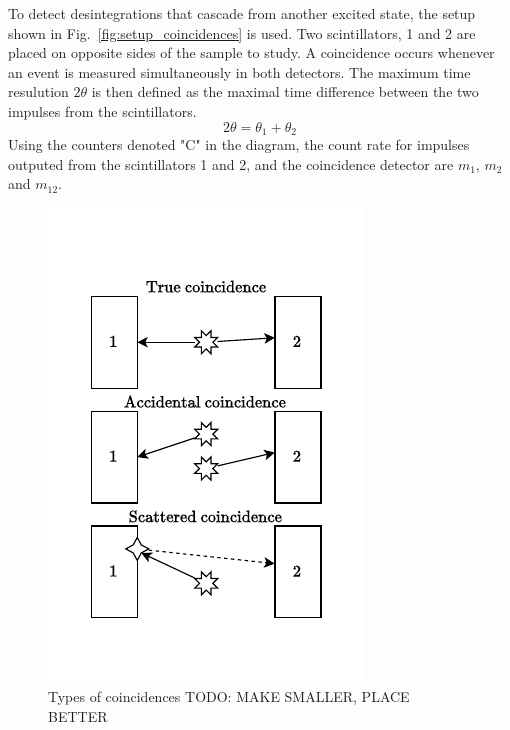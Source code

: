 To detect desintegrations that cascade from another excited state, the setup shown in \hbox{Fig. \ref{fig:setup_coincidences}} is used. Two scintillators, 1 and 2 are placed on opposite sides of the sample to study. A coincidence occurs whenever an event is measured simultaneously in both detectors. The maximum time resulution \(2 \theta\) is then defined as the maximal time difference between the two impulses from the scintillators.
\begin{equation}
    2 \theta = \theta_1 + \theta_{2}
\end{equation}
Using the counters denoted "C" in the diagram, the count rate for impulses outputed from the scintillators 1 and 2, and the coincidence detector are \(m_1\), \(m_2\) and \(m_{12}\). 

\begin{figure}
    \includegraphics[width=\linewidth, trim={0 1cm 0 1.2cm}, clip]{figures/coincidence_types.pdf}
    \caption{Types of coincidences TODO: MAKE SMALLER, PLACE BETTER}
\end{figure}
